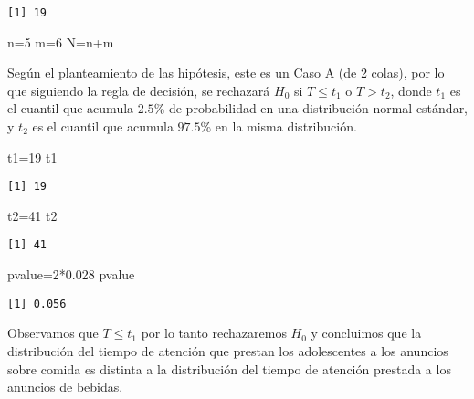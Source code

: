 \documentclass[
  a4paper,
  oneside,
  openany]{book}
\newenvironment{Shaded}{\begin{snugshade}}{\end{snugshade}}
\newcommand{\DecValTok}[1]{\textcolor[rgb]{0.00,0.00,0.81}{#1}}
\newcommand{\FloatTok}[1]{\textcolor[rgb]{0.00,0.00,0.81}{#1}}
\newcommand{\NormalTok}[1]{#1}
\newcommand{\OtherTok}[1]{\textcolor[rgb]{0.56,0.35,0.01}{#1}}
\newcommand{\SpecialCharTok}[1]{\textcolor[rgb]{0.00,0.00,0.00}{#1}}
\begin{document}
\begin{verbatim}
[1] 19
\end{verbatim}

\begin{Shaded}
\begin{Highlighting}[]
\NormalTok{n}\OtherTok{=}\DecValTok{5}
\NormalTok{m}\OtherTok{=}\DecValTok{6}
\NormalTok{N}\OtherTok{=}\NormalTok{n}\SpecialCharTok{+}\NormalTok{m}
\end{Highlighting}
\end{Shaded}

Según el planteamiento de las hipótesis, este es un Caso A (de 2 colas), por lo que siguiendo la regla de decisión, se rechazará \(H_0\) si \(T \leq t_1\) o \(T> t_2\), donde \(t_1\) es el cuantil que acumula \(2.5\%\) de probabilidad en una distribución normal estándar, y \(t_2\) es el cuantil que acumula \(97.5\%\) en la misma distribución.

\begin{Shaded}
\begin{Highlighting}[]
\NormalTok{t1}\OtherTok{=}\DecValTok{19}
\NormalTok{t1}
\end{Highlighting}
\end{Shaded}

\begin{verbatim}
[1] 19
\end{verbatim}

\begin{Shaded}
\begin{Highlighting}[]
\NormalTok{t2}\OtherTok{=}\DecValTok{41}
\NormalTok{t2}
\end{Highlighting}
\end{Shaded}

\begin{verbatim}
[1] 41
\end{verbatim}

\begin{Shaded}
\begin{Highlighting}[]
\NormalTok{pvalue}\OtherTok{=}\DecValTok{2}\SpecialCharTok{*}\FloatTok{0.028}
\NormalTok{pvalue}
\end{Highlighting}
\end{Shaded}

\begin{verbatim}
[1] 0.056
\end{verbatim}

Observamos que \(T \leq t_1\) por lo tanto rechazaremos \(H_0\) y concluimos que la distribución del tiempo de atención que prestan los adolescentes a los anuncios sobre comida es distinta a la distribución del tiempo de atención prestada a los anuncios de bebidas.
\end{document}

